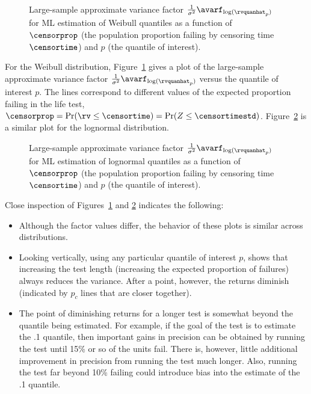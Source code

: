 \begin{figure}
\caption{Large-sample approximate variance factor 
$\frac{1}{\sigma^{2}}\avarf_{\log(\rvquanhat_{p})}$ for ML
estimation of Weibull quantiles as a function of $\censorprop$ (the
population proportion failing by censoring time $\censortime$) and
$p$ (the quantile of interest).}
\label{figure:weib.quant.avarf.ps}
\end{figure}
For the Weibull distribution,
Figure~\ref{figure:weib.quant.avarf.ps} gives a plot of the
large-sample approximate variance factor
$\frac{1}{\sigma^{2}}\avarf_{\log(\rvquanhat_{p})}$ versus the
quantile of interest $p$. The lines correspond to different values
of the expected proportion failing in the life test,
$\censorprop=\Pr(\rv
\leq \censortime )=\Pr(Z \leq \censortimestd )$.  
Figure~\ref{figure:lnor.quant.avarf.ps} 
is a similar plot for the lognormal distribution.

\begin{figure}
\caption{Large-sample approximate variance factor 
$\frac{1}{\sigma^{2}}\avarf_{\log(\rvquanhat_{p})}$ for ML
estimation of lognormal quantiles as a function of $\censorprop$
(the population proportion failing by censoring time $\censortime$)
and $p$ (the quantile of interest).}
\label{figure:lnor.quant.avarf.ps}
\end{figure}
Close inspection of Figures~\ref{figure:weib.quant.avarf.ps} and
\ref{figure:lnor.quant.avarf.ps} indicates the following:
\begin{itemize}
\item
Although the factor values differ, the behavior of
these plots is similar across distributions.
\item Looking vertically,
using any particular quantile of interest $p$, shows that
increasing the test length (increasing the expected
proportion of failures)  always reduces the 	
 variance. After a point, however, the returns diminish (indicated by
$p_{c}$ lines that are closer together).
\item
The point of diminishing returns for a longer test is somewhat
beyond the quantile being estimated.  For example, if the goal of
the test is to estimate the .1 quantile, then important gains in
precision can be obtained by running the test until 15\% or so of
the units fail. There is, however, little additional improvement in
precision from running the test much longer. Also, running the test
far beyond 10\% failing could introduce bias into the estimate of
the .1 quantile.
\end{itemize}

